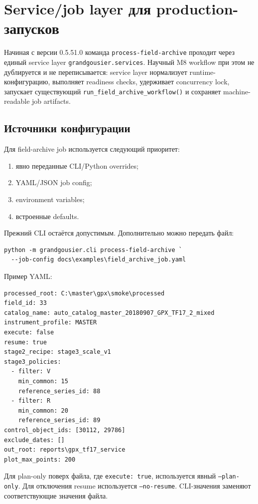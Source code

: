\chapter{Service/job layer для production-запусков}

Начиная с версии 0.5.51.0 команда \texttt{process-field-archive} проходит через единый service layer \texttt{grandgousier.services}. Научный M8 workflow при этом не дублируется и не переписывается: service layer нормализует runtime-конфигурацию, выполняет readiness checks, удерживает concurrency lock, запускает существующий \texttt{run\_field\_archive\_workflow()} и сохраняет machine-readable job artifacts.

\section{Источники конфигурации}

Для field-archive job используется следующий приоритет:

\begin{enumerate}
  \item явно переданные CLI/Python overrides;
  \item YAML/JSON job config;
  \item environment variables;
  \item встроенные defaults.
\end{enumerate}

Прежний CLI остаётся допустимым. Дополнительно можно передать файл:

\begin{lstlisting}
python -m grandgousier.cli process-field-archive `
  --job-config docs\examples\field_archive_job.yaml
\end{lstlisting}

Пример YAML:

\begin{lstlisting}
processed_root: C:\master\gpx\smoke\processed
field_id: 33
catalog_name: auto_catalog_master_20180907_GPX_TF17_2_mixed
instrument_profile: MASTER
execute: false
resume: true
stage2_recipe: stage3_scale_v1
stage3_policies:
  - filter: V
    min_common: 15
    reference_series_id: 88
  - filter: R
    min_common: 20
    reference_series_id: 89
control_object_ids: [30112, 29786]
exclude_dates: []
out_root: reports\gpx_tf17_service
plot_max_points: 200
\end{lstlisting}

Для plan-only поверх файла, где \texttt{execute: true}, используется явный \texttt{--plan-only}. Для отключения resume используется \texttt{--no-resume}. CLI-значения заменяют соответствующие значения файла.

